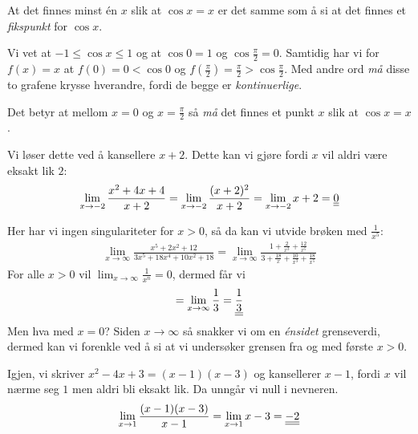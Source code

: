 \documentclass[a4paper,norsk,12pt]{article}
\begin{document}
At det finnes minst én $x$ slik at $\cos{x}=x$ er det samme som å si at det
finnes et \textit{fikspunkt} for $\cos{x}$.

Vi vet at $-1 \leq \cos{x} \leq 1$ og at $\cos{0} = 1$ og $\cos{\frac{\pi}{2}}
= 0$. Samtidig har vi for $f(x)=x$ at $f(0) = 0 < \cos{0}$ og $f(\frac{\pi}{2})
= \frac{\pi}{2} > \cos{\frac{\pi}{2}}$. Med andre ord \textit{må} disse to
grafene krysse hverandre, fordi de begge er \textit{kontinuerlige}.

Det betyr at mellom $x=0$ og $x=\frac{\pi}{2}$ så \textit{må} det finnes et punkt $x$
slik at $\cos{x} = x$.


Vi løser dette ved å kansellere $x+2$. Dette kan vi gjøre
fordi $x$ vil aldri være eksakt lik $2$:
\begin{equation*}
\begin{split}
  \lim_{x \to -2}{\frac{x^2+4x+4}{x+2}} = \lim_{x \to -2}{\frac{(x+2)^2}{x+2}}
  = \lim_{x \to -2}{x+2} = {\underline{\underline{0}}}
\end{split}
\end{equation*}

Her har vi ingen singulariteter for $x>0$, så da kan vi utvide brøken med
$\frac{1}{x^5}$:
\begin{equation*}
\begin{split}
  \lim_{x \to \infty}{\frac{x^5+2x^2+12}{3x^5+18x^4+10x^2+18}} =
    \lim_{x \to \infty}{
        \frac{
          1+\frac{2}{x^3}+\frac{12}{x^5}
        }{
          3+\frac{18}{x}+\frac{10}{x^3}+\frac{18}{x^5}
      }}
\end{split}
\end{equation*}
For alle $x>0$ vil $\lim_{x \to \infty}{\frac{1}{x^n}} = 0$, dermed får vi
\begin{equation*}
\begin{split}
  = \lim_{x \to \infty}{\frac{1}{3}} = {\underline{\underline{\frac{1}{3}}}}
\end{split}
\end{equation*}
Men hva med $x=0$? Siden $x\to\infty$ så snakker vi om en \textit{énsidet}
grenseverdi, dermed kan vi forenkle ved å si at vi undersøker grensen fra og
med første $x>0$.

Igjen, vi skriver $x^2-4x+3 = (x-1)(x-3)$ og kansellerer $x-1$, fordi $x$ vil
nærme seg $1$ men aldri bli eksakt lik. Da unngår vi null i nevneren.
\begin{equation*}
\begin{split}
  \lim_{x \to 1}{\frac{(x-1)(x-3)}{x-1}} =
  \lim_{x \to 1}{x-3} = {\underline{\underline{-2}}}
\end{split}
\end{equation*}
\end{document}
